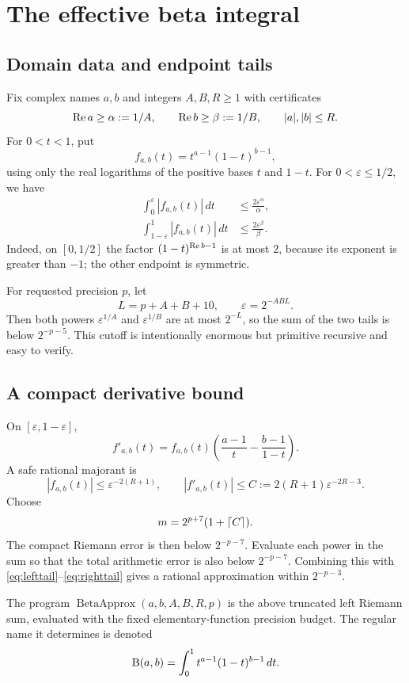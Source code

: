 \section{The effective beta integral}
\label{sec:definition}

\subsection{Domain data and endpoint tails}

Fix complex names $a,b$ and integers $A,B,R\ge1$ with certificates
\[
 \operatorname{Re} a\ge\alpha:=1/A,
 \qquad \operatorname{Re} b\ge\beta:=1/B,
 \qquad |a|,|b|\le R.
\]
For $0<t<1$, put
\[
 f_{a,b}(t)=t^{a-1}(1-t)^{b-1},
\]
using only the real logarithms of the positive bases $t$ and $1-t$.
For $0<\varepsilon\le1/2$, we have
\begin{align}
 \int_0^\varepsilon |f_{a,b}(t)|\,dt
 &\le \frac{2\varepsilon^\alpha}{\alpha},
 \label{eq:lefttail}\\
 \int_{1-\varepsilon}^1 |f_{a,b}(t)|\,dt
 &\le \frac{2\varepsilon^\beta}{\beta}.
 \label{eq:righttail}
\end{align}
Indeed, on $[0,1/2]$ the factor $(1-t)^{\operatorname{Re} b-1}$ is at most $2$, because its exponent is greater than $-1$; the other endpoint is symmetric.

For requested precision $p$, let
\[
 L=p+A+B+10,
 \qquad \varepsilon=2^{-ABL}.
\]
Then both powers $\varepsilon^{1/A}$ and $\varepsilon^{1/B}$ are at most $2^{-L}$, so the sum of the two tails is below $2^{-p-5}$.  This cutoff is intentionally enormous but primitive recursive and easy to verify.

\subsection{A compact derivative bound}

On $[\varepsilon,1-\varepsilon]$,
\[
 f'_{a,b}(t)=f_{a,b}(t)
 \left(\frac{a-1}{t}-\frac{b-1}{1-t}\right).
\]
A safe rational majorant is
\[
 |f_{a,b}(t)|\le \varepsilon^{-2(R+1)},
 \qquad
 |f'_{a,b}(t)|\le C:=2(R+1)\varepsilon^{-2R-3}.
\]
Choose
\[
 m=2^{p+7}(1+\left\lceil C\right\rceil).
\]
The compact Riemann error is then below $2^{-p-7}$.  Evaluate each power in the sum so that the total arithmetic error is also below $2^{-p-7}$.  Combining this with \eqref{eq:lefttail}--\eqref{eq:righttail} gives a rational approximation within $2^{-p-3}$.

\begin{definition}
The program $\operatorname{BetaApprox}(a,b,A,B,R,p)$ is the above truncated left Riemann sum, evaluated with the fixed elementary-function precision budget.  The regular name it determines is denoted
\[
 \mathrm B(a,b)=\int_0^1 t^{a-1}(1-t)^{b-1}\,dt.
\]
\end{definition}

